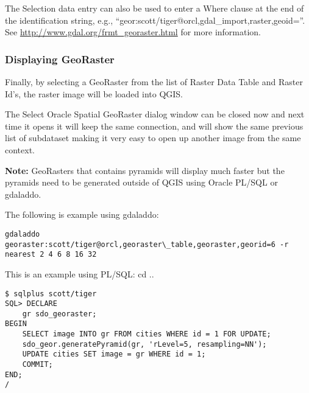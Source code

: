 The Selection data entry can also be used to enter a Where clause at the end of the  identification string, e.g., 
``geor:scott/tiger@orcl,gdal\_import,raster,geoid=''. See \url{http://www.gdal.org/frmt_georaster.html} for more information.

\subsubsection{Displaying GeoRaster}

Finally, by selecting a GeoRaster from the list of Raster Data Table and Raster Id's, the raster image will be 
loaded into QGIS.

The Select Oracle Spatial GeoRaster dialog window can be closed now and next time it opens it will keep the same 
connection, and will show the same previous list of subdataset making it very easy to open up another image 
from the same context.

\textbf{Note:} GeoRasters that contains pyramids will display much faster but the pyramids need to be generated 
outside of QGIS using Oracle PL/SQL or gdaladdo.

The following is example using gdaladdo:

\begin{verbatim}
gdaladdo georaster:scott/tiger@orcl,georaster\_table,georaster,georid=6 -r 
nearest 2 4 6 8 16 32
\end{verbatim}

This is an example using PL/SQL: 
cd ..
\begin{verbatim}
$ sqlplus scott/tiger
SQL> DECLARE
    gr sdo_georaster;
BEGIN
    SELECT image INTO gr FROM cities WHERE id = 1 FOR UPDATE;
    sdo_geor.generatePyramid(gr, 'rLevel=5, resampling=NN');
    UPDATE cities SET image = gr WHERE id = 1;
    COMMIT;
END;
/
\end{verbatim}

